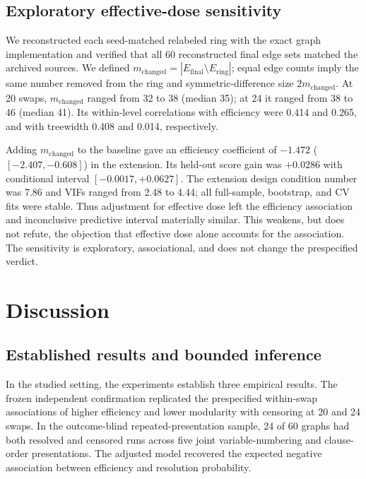 \documentclass[11pt]{article}
\begin{document}
\subsection{Exploratory effective-dose sensitivity}
\label{sec:effective-dose}

We reconstructed each seed-matched relabeled ring with the exact graph implementation and verified that all 60 reconstructed final edge sets matched the archived sources. We defined $m_{\mathrm{changed}}=|E_{\mathrm{final}}\setminus E_{\mathrm{ring}}|$; equal edge counts imply the same number removed from the ring and symmetric-difference size $2m_{\mathrm{changed}}$. At 20 swaps, $m_{\mathrm{changed}}$ ranged from 32 to 38 (median 35); at 24 it ranged from 38 to 46 (median 41). Its within-level correlations with efficiency were 0.414 and 0.265, and with treewidth 0.408 and 0.014, respectively.

Adding $m_{\mathrm{changed}}$ to the baseline gave an efficiency coefficient of $-1.472$ ($[-2.407,-0.608]$) in the extension. Its held-out score gain was $+0.0286$ with conditional interval $[-0.0017,+0.0627]$. The extension design condition number was 7.86 and VIFs ranged from 2.48 to 4.44; all full-sample, bootstrap, and CV fits were stable. Thus adjustment for effective dose left the efficiency association and inconclusive predictive interval materially similar. This weakens, but does not refute, the objection that effective dose alone accounts for the association. The sensitivity is exploratory, associational, and does not change the prespecified verdict.

\section{Discussion}

\subsection{Established results and bounded inference}

In the studied setting, the experiments establish three empirical results. The frozen independent confirmation replicated the prespecified within-swap associations of higher efficiency and lower modularity with censoring at 20 and 24 swaps. In the outcome-blind repeated-presentation sample, 24 of 60 graphs had both resolved and censored runs across five joint variable-numbering and clause-order presentations. The adjusted model recovered the expected negative association between efficiency and resolution probability.
\end{document}
